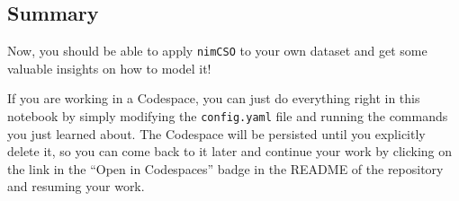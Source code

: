 \hypertarget{summary}{%
\subsection{Summary}\label{nimcsotutorial:summary}}

Now, you should be able to apply \texttt{nimCSO} to
your own dataset and get some valuable insights on how to model it!

If you are working in a Codespace, you can just do everything right in
this notebook by simply modifying the
\texttt{config.yaml} file and running the commands you
just learned about. The Codespace will be persisted until you explicitly
delete it, so you can come back to it later and continue your work by
clicking on the link in the ``Open in Codespaces'' badge in the README
of the repository and resuming your work.

